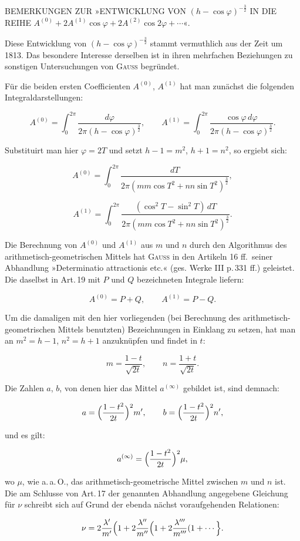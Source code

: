 %

\begin{center}
BEMERKUNGEN ZUR »ENTWICKLUNG VON $(h-\cos\varphi)^{-\frac{3}{2}}$
IN DIE REIHE $A^{(0)}+2A^{(1)}\cos\varphi+2A^{(2)}\cos2\varphi+\cdots$«.
\end{center}

Diese Entwicklung von $(h-\cos\varphi)^{-\frac{3}{2}}$ stammt vermuthlich aus der Zeit um
1813. Das besondere Interesse derselben ist in ihren mehrfachen Beziehungen zu sonstigen
Untersuchungen von \textsc{Gauss} begründet.

Für die beiden ersten Coefficienten $A^{(0)}$, $A^{(1)}$ hat man
zunächst die folgenden Integraldarstellungen:

\[
A^{(0)}=\int_{0}^{2\pi}\frac{d\varphi}{2\pi(h-\cos\varphi)^{\frac{3}{2}}},\qquad
A^{(1)}=\int_{0}^{2\pi}\frac{\cos\varphi\,d\varphi}{2\pi(h-\cos\varphi)^{\frac{3}{2}}}.
\]

\noindent Substituirt man hier $\varphi=2T$ und setzt $h-1=m^{2}$, $h+1=n^{2}$, so ergiebt sich:

\[
A^{(0)}=\int_{0}^{2\pi}\frac{dT}{2\pi(mm\cos T^{2}+nn\sin T^{2})^{\frac{3}{2}}},
\]

\[
A^{(1)}=\int_{0}^{2\pi}\frac{(\cos^{2}T-\sin^{2}T)\,dT}{2\pi(mm\cos T^{2}+nn\sin T^{2})^{\frac{3}{2}}}.
\]

\noindent Die Berechnung von $A^{(0)}$ und $A^{(1)}$ aus $m$ und $n$ durch den
Algorithmus des arithmetisch-geometrischen Mittels hat \textsc{Gauss} in den Artikeln 16 ff.\
seiner Abhandlung »Determinatio attractionis etc.« (ges. Werke III p.\,331 ff.)
geleistet. Die daselbst in Art.\,19 mit $P$ und $Q$ bezeichneten Integrale liefern:

\[
A^{(0)}=P+Q,\qquad A^{(1)}=P-Q.
\]

\noindent Um die damaligen mit den hier vorliegenden (bei Berechnung des
arithmetisch-geometrischen Mittels benutzten) Bezeichnungen in Einklang zu setzen, hat
man an $m^{2}=h-1$, $n^{2}=h+1$ anzuknüpfen und findet in $t$:

\[
m=\frac{1-t}{\sqrt{2t}},\qquad n=\frac{1+t}{\sqrt{2t}}.
\]

\noindent Die Zahlen $a$, $b$, von denen hier das Mittel $a^{(\infty)}$ gebildet ist, sind
demnach:

\[
a=\Bigl(\frac{1-t^{2}}{2t}\Bigr)^{2}m',\qquad b=\Bigl(\frac{1-t^{2}}{2t}\Bigr)^{2}n',
\]

\noindent und es gilt:

\[
a^{(\infty)}=\Bigl(\frac{1-t^{2}}{2t}\Bigr)^{2}\mu,
\]

\noindent wo $\mu$, wie a.\,a.\,O., das arithmetisch-geometrische Mittel zwischen $m$ und $n$ ist.
Die am Schlusse von Art.\,17 der genannten Abhandlung angegebene Gleichung für $\nu$
schreibt sich auf Grund der ebenda nächst voraufgehenden Relationen:

\[
\nu=2\frac{\lambda'}{m'}\Bigl(1+2\frac{\lambda''}{m''}\Bigl(1+2\frac{\lambda'''}{m'''}(1+\cdots\Bigr\}.
\]
